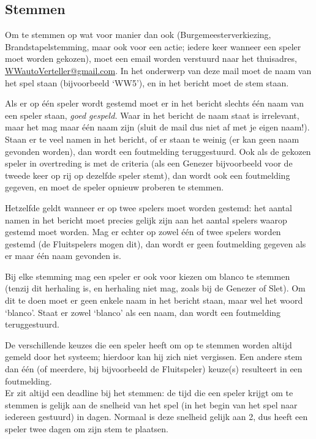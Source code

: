 \documentclass[12pt]{article}
\begin{document}
  \subsection{Stemmen}
  
    Om te stemmen op wat voor manier dan ook (Burgemeesterverkiezing, Brandstapelstemming, maar ook voor een actie; iedere keer wanneer een speler moet worden gekozen), moet een email worden verstuurd naar het thuisadres, \href{mailto:<WWautoVerteller@gmail.com>}{WWautoVerteller@gmail.com}. In het onderwerp van deze mail moet de naam van het spel staan (bijvoorbeeld `WW5'), en in het bericht moet de stem staan. 
    
    Als er op \'e\'en speler wordt gestemd moet er in het bericht slechts \'e\'en naam van een speler staan, \emph{goed gespeld.} Waar in het bericht de naam staat is irrelevant, maar het mag maar \'e\'en naam zijn (sluit de mail dus niet af met je eigen naam!). Staan er te veel namen in het bericht, of er staan te weinig (er kan geen naam gevonden worden), dan wordt een foutmelding teruggestuurd. Ook als de gekozen speler in overtreding is met de criteria (als een Genezer bijvoorbeeld voor de tweede keer op rij op dezelfde speler stemt), dan wordt ook een foutmelding gegeven, en moet de speler opnieuw proberen te stemmen.
    
    Hetzelfde geldt wanneer er op twee spelers moet worden gestemd: het aantal namen in het bericht moet precies gelijk zijn aan het aantal spelers waarop gestemd moet worden. Mag er echter op zowel \'e\'en of twee spelers worden gestemd (de Fluitspelers mogen dit), dan wordt er geen foutmelding gegeven als er maar \'e\'en naam gevonden is.
    
    Bij elke stemming mag een speler er ook voor kiezen om blanco te stemmen (tenzij dit herhaling is, en herhaling niet mag, zoals bij de Genezer of Slet). Om dit te doen moet er geen enkele naam in het bericht staan, maar wel het woord `blanco'. Staat er zowel `blanco' als een naam, dan wordt een foutmelding teruggestuurd.

    De verschillende keuzes die een speler heeft om op te stemmen worden altijd gemeld door het systeem; hierdoor kan hij zich niet vergissen. Een andere stem dan \'e\'en (of meerdere, bij bijvoorbeeld de Fluitspeler) keuze(s) resulteert in een foutmelding.
    \\[\baselineskip]
    Er zit altijd een deadline bij het stemmen: de tijd die een speler krijgt om te stemmen is gelijk aan de snelheid van het spel (in het begin van het spel naar iedereen gestuurd) in dagen. Normaal is deze snelheid gelijk aan 2, dus heeft een speler twee dagen om zijn stem te plaatsen. 
    
\end{document}
